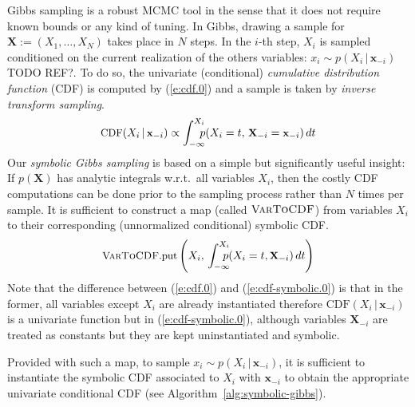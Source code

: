 \documentclass{article}
\newcommand{\bvec}[1]{\textbf{#1}}
\newcommand{\pr}{p}
\begin{document}
Gibbs sampling is a robust MCMC tool in the sense that it does not require known bounds or any kind of tuning.
In Gibbs, drawing a sample for $\bvec{X} := (X_1, \ldots, X_N)$ takes place in $N$ steps.
In the $i$-th step, $X_i$ is sampled conditioned on the current realization of the others variables:
$x_i \sim \pr(X_i \,|\, \bvec{x}_{-i})$
{\color{red}TODO REF?}.
To do so, the univariate (conditional) 
\emph{cumulative distribution function} (CDF)
is computed by (\ref{e:cdf.0}) and a sample is taken by \emph{inverse transform sampling}. 
\begin{equation} \footnotesize
\label{e:cdf.0}
\text{CDF}(X_i  \,|\, \bvec{x}_{-i}) 
\propto
\int_{-\infty}^{X_i} \!\!\!\! \pr(X_i = t, \,\bvec{X}_{-i} = \bvec{x}_{-i}) \, d  t
\end{equation} 
%
Our \emph{symbolic Gibbs sampling} is based on a simple but significantly useful insight:
If $\pr(\bvec{X})$
has analytic integrals w.r.t.\ all variables $X_i$,
then the costly CDF computations can be done prior to the sampling process rather than $N$ times per sample. 
It is sufficient to construct a map (called $\textsc{VarToCDF}$) from variables $X_i$ to their corresponding (unnormalized conditional) symbolic CDF. 
\begin{equation} \footnotesize
\label{e:cdf-symbolic.0}	
\textsc{VarToCDF}\text{.put}
\left(
X_i, \, %
\int_{-\infty}^{X_i} \!\!\!\!\! \pr(X_i = t , \bvec{X}_{-i}) \, d  t
\right)
\end{equation} 
Note that the difference between (\ref{e:cdf.0}) and (\ref{e:cdf-symbolic.0}) is that in the former, 
all variables except $X_i$ are already instantiated therefore 
$\text{CDF}(X_i  \,|\, \bvec{x}_{-i})$ is a univariate function but in  (\ref{e:cdf-symbolic.0}), 
although variables $\bvec{X}_{-i}$ are treated as constants but they are kept uninstantiated and symbolic.

Provided with such a map, 
to sample $x_i \sim \pr(X_i \,|\, \bvec{x}_{-i})$,
it is sufficient to {\color{blue}instantiate the symbolic CDF associated to $X_i$ with  
$\bvec{x}_{-i}$} to obtain the appropriate univariate conditional CDF
(see Algorithm~\ref{alg:symbolic-gibbs}).
\end{document}
